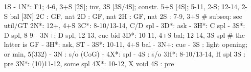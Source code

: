 1S -
1N*: F1; 4-6, 3+S [2S]; inv, 3S [3S/4S]; constr. 5+S [4S]; 5-11, 2-S; 12-14, 2-S bal [3N]
2C : GF, nat
2D : GF, nat
2H : GF, nat
2S : 7-9, 3+S  # subseq: see util/GT
2N*: 12+, 4+S
3C*: 8-10/13-14, C/D spl
   - 3D*: ask
        - 3H*: C spl
        - 3S*: D spl, 8-9
        - 3N+: D spl, 12-13, cue-bid
3D*: 10-11, 4+S bal; 12-14, 3S spl  # the latter is GF
   - 3H*: ask, ST
        - 3S*: 10-11, 4+S bal
        - 3N+: cue
   - 3S : light opening; or min, 5(332)
   - 3N : s/o (CoG)
   - 4X*: spl
   - 4S : s/o
3H*: 8-10/13-14, H spl
3S : pre
3N*: (10)11-12, some spl
4X*: 10-12, X void
4S : pre